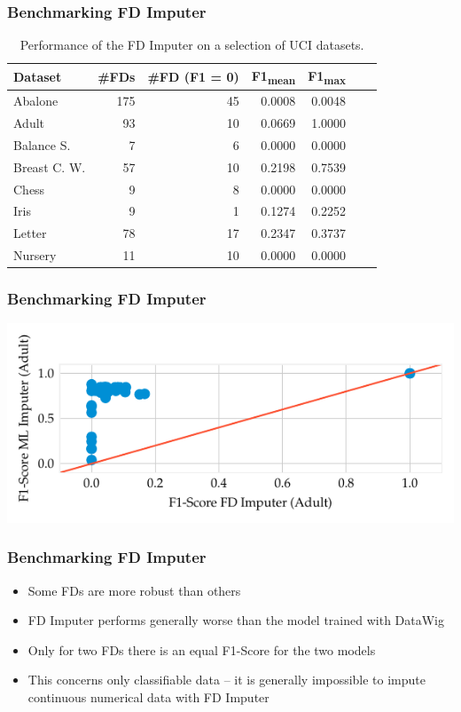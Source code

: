 \documentclass{beamer}
\begin{document}
\begin{frame}
    \frametitle{Benchmarking FD Imputer}
    \begin{table}[ht]
        \centering
        \begin{tabular}{lrrrrrr}
            \toprule
            \toprule
            Dataset & \#FDs & \#FD (F1 = 0) & F1\textsubscript{mean} & F1\textsubscript{max} \\
            \midrule
            Abalone & 175 & 45 & 0.0008 & 0.0048 \\
            Adult & 93 & 10 & 0.0669 & 1.0000 \\
            Balance S. & 7 & 6 & 0.0000 & 0.0000 \\
            Breast C. W. & 57 & 10 & 0.2198 & 0.7539 \\
            Chess & 9 & 8 & 0.0000 & 0.0000 \\
            Iris & 9 & 1 & 0.1274 & 0.2252 \\
            Letter & 78 & 17 & 0.2347 & 0.3737 \\
            Nursery & 11 & 10 & 0.0000 & 0.0000  \\
            \bottomrule
            \bottomrule
        \end{tabular}
        \caption{Performance of the FD Imputer on a selection of UCI datasets.}\label{tab:fd-imputer-performance}
    \end{table}
\end{frame}

\begin{frame}
    \frametitle{Benchmarking FD Imputer}
    \includegraphics[width=\textwidth]{f1_ml_fd.pdf}
\end{frame}

\begin{frame}
    \frametitle{Benchmarking FD Imputer}
    \begin{itemize}
        \item Some FDs are more robust than others
        \item FD Imputer performs generally worse than the model trained with DataWig
        \item Only for two FDs there is an equal F1-Score for the two models
        \item This concerns only classifiable data -- it is generally impossible to impute continuous numerical data with FD Imputer
    \end{itemize}
\end{frame}
\end{document}
